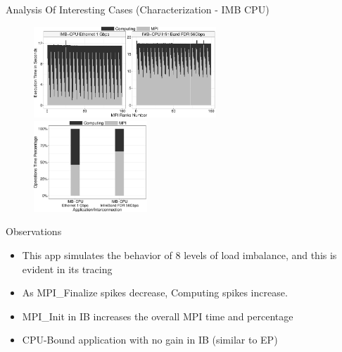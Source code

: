 \documentclass{beamer}
\begin{document}
\begin{frame}{Analysis Of Interesting Cases (Characterization - IMB CPU)}
\begin{figure}
   \includegraphics[width=0.61\textwidth]{SLIDES/img/IMB-CPU.charac.pdf}
   \includegraphics[width=0.38\textwidth]{SLIDES/img/IMB_CPU.percentage.pdf}
\end{figure}
\pause Observations
\begin{itemize}
    \item This app simulates the behavior of \alert{8 levels} of \alert{load imbalance}, and this is evident in its tracing
    \pause \item As \alert{MPI\_Finalize spikes decrease}, \alert{Computing spikes increase}.
    \pause \item MPI\_Init in IB increases the \alert{overall MPI time and percentage}
    \pause \item CPU-Bound application with no gain in IB (similar to EP) 

\end{itemize}
\end{frame}
\end{document}
